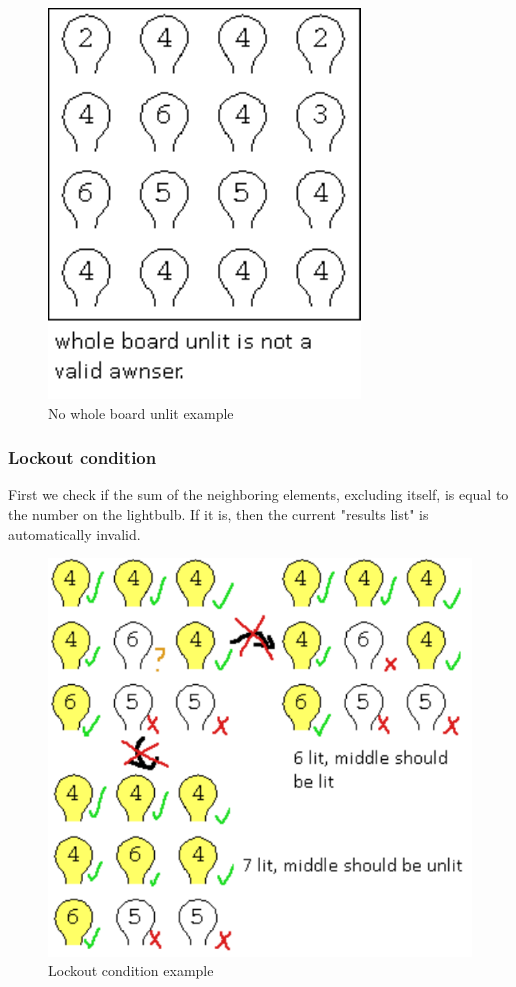 \documentclass[runningheads]{llncs}
\begin{document}
\begin{figure}
	\includegraphics[scale=0.5]{lightbulb_no_whole_board_unlit_restriction}
	\centering
	\caption{No whole board unlit example}
	\centering
	\end{figure}
\clearpage
\subsubsection*{Lockout condition} \hfill \break
First we check if the sum of the neighboring elements, excluding itself, is equal to the number on the lightbulb. If it is, then the current "results list" is automatically invalid.
\begin{figure}
	\includegraphics[scale=0.5]{lightbulb_impossible_state}
	\centering
	\caption{Lockout condition example}
	\centering
\end{figure}
\end{document}
